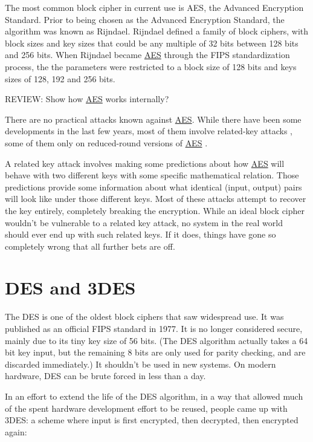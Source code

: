 \documentclass[11pt,ebook,table,dvipsnames]{memoir}
\begin{document}
The most common block cipher in current use is \gls{AES}, the Advanced
Encryption Standard. Prior to being chosen as the Advanced Encryption
Standard, the algorithm was known as Rijndael. Rijndael defined a
family of block ciphers, with block sizes and key sizes that could be
any multiple of 32 bits between 128 bits and 256 bits.
\cite{daemen:aes} When Rijndael became \hyperref[AES]{AES} through the \gls{FIPS}
standardization process, the the parameters were restricted to a block
size of 128 bits and keys sizes of 128, 192 and 256 bits.
\cite{fips:aes}

REVIEW: Show how \hyperref[AES]{AES} works internally?

There are no practical attacks known against \hyperref[AES]{AES}. While there have
been some developments in the last few years, most of them involve
related-key attacks \cite{cryptoeprint:2009:317}, some of them only on
reduced-round versions of \hyperref[AES]{AES} \cite{cryptoeprint:2009:374}.

A related key attack involves making some predictions about how \hyperref[AES]{AES}
will behave with two different keys with some specific mathematical
relation. Those predictions provide some information about what
identical (input, output) pairs will look like under those different
keys. Most of these attacks attempt to recover the key entirely,
completely breaking the encryption. While an ideal block cipher
wouldn't be vulnerable to a related key attack, no system in the real
world should ever end up with such related keys. If it does, things
have gone so completely wrong that all further bets are off.
\section{DES and 3DES}
\label{sec-2-2-3}

The \gls{DES} is one of the oldest block ciphers that saw widespread
use. It was published as an official \gls{FIPS} standard in 1977. It
is no longer considered secure, mainly due to its tiny key size of 56
bits. (The DES algorithm actually takes a 64 bit key input, but the
remaining 8 bits are only used for parity checking, and are discarded
immediately.) It shouldn't be used in new systems. On modern hardware,
DES can be brute forced in less than a day. \cite{sciengines:breakdes}

In an effort to extend the life of the DES algorithm, in a way that
allowed much of the spent hardware development effort to be reused,
people came up with 3DES: a scheme where input is first encrypted,
then decrypted, then encrypted again:
\end{document}

